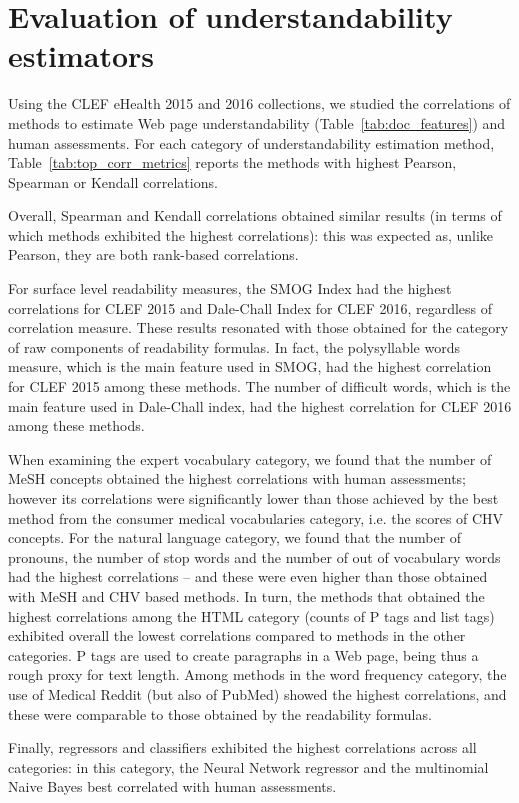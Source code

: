 \section{Evaluation of understandability estimators}
\label{sec:beyond_readability}
Using the CLEF eHealth 2015 and 2016 collections, we studied the correlations of methods to estimate Web page understandability (Table~\ref{tab:doc_features}) and human assessments. For each category of understandability estimation method, Table~\ref{tab:top_corr_metrics} reports the methods with highest Pearson, Spearman or Kendall correlations.

Overall, Spearman and Kendall correlations obtained similar results (in terms of which methods exhibited the highest correlations): this was expected as, unlike Pearson, they are both rank-based correlations.

For surface level readability measures,  the SMOG Index had the highest correlations for CLEF 2015 and Dale-Chall Index for CLEF 2016, regardless of correlation measure. These results resonated with those obtained for the category of raw components of readability formulas. In fact, the polysyllable words measure, which is the main feature used in SMOG, had the highest correlation for CLEF 2015 among these methods. The number of difficult words, which is the main feature used in Dale-Chall index, had the highest correlation for CLEF 2016 among these methods.

When examining the expert vocabulary category, we found that the number of MeSH concepts obtained the highest correlations with human assessments; however its correlations were significantly lower than those achieved by the best method from the consumer medical vocabularies category, i.e. the scores of CHV concepts. For the natural language category, we found that the number of pronouns, the number of stop words and the number of out of vocabulary words had the highest correlations -- and these were even higher than those obtained with MeSH and CHV based methods. In turn, the methods that obtained the highest correlations among the HTML category (counts of P tags and list tags) exhibited overall the lowest correlations compared to methods in the other categories. P tags are used to create paragraphs in a Web page, being thus a rough proxy for text length. 
Among methods in the word frequency category, the use of Medical Reddit (but also of PubMed) showed the highest correlations, and these were comparable to those obtained by the readability formulas. 

Finally, regressors and classifiers exhibited the highest correlations across all categories: in this  category, the  Neural Network regressor and the multinomial Naive Bayes best correlated with human assessments. 




